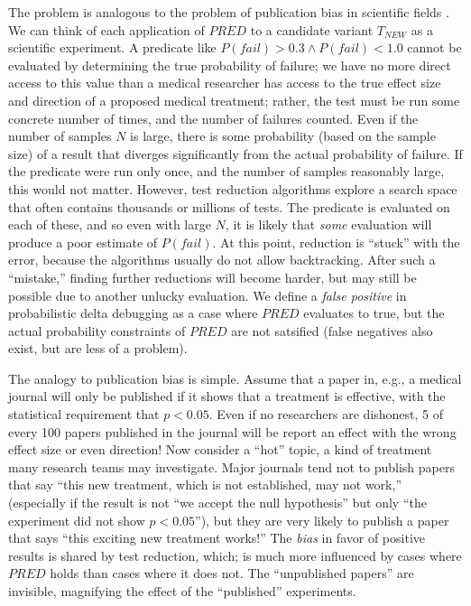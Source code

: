 The problem is analogous to the problem of publication bias in
scientific fields \cite{ahmed2012assessment}.  We can think of each
application of $\mathit{PRED}$ to a candidate variant
$T_{\mathit{NEW}}$ as a scientific experiment.  A predicate like
$P(\mathit{fail}) > 0.3 \wedge P(\mathit{fail}) < 1.0$ cannot be evaluated by
determining the true probability of failure; we have no more direct access to
this value than a medical researcher has access to the true effect
size and direction of a proposed medical treatment; rather, the test must be
run some concrete number of times, and the number of failures counted.
Even if the number of samples $N$ is large, there is some
probability (based on the sample size) of a result that diverges
significantly from the actual probability of failure.  If the
predicate were run only once, and the number of samples reasonably
large, this would not matter.  However, test reduction algorithms explore a search
space that often contains thousands or millions of
tests.  The predicate is evaluated on each of these, and so
even with large $N$, it is likely that \emph{some} evaluation will
produce a poor estimate of $P(\mathit{fail})$.  At this point, reduction is
``stuck'' with the error, because the
algorithms usually do not allow backtracking.  After such a ``mistake,'' finding further
reductions will become harder, but may still be possible due to
another unlucky evaluation.  We define a \emph{false positive} in probabilistic
delta debugging as a case where $\mathit{PRED}$ evaluates to true, but
the actual probability constraints of $\mathit{PRED}$ are not
satsified (false negatives
also exist, but are less of a problem).

The analogy to publication bias is simple.  Assume that a paper in,
e.g., a medical journal will only be published if it shows that a
treatment is effective, with the statistical requirement that $p <
0.05$.  Even if no researchers are dishonest, 5 of every 100 papers published
in the journal will be report an effect with the wrong effect size or
even direction!  Now consider a ``hot'' topic, a kind of
treatment many research teams may investigate.  Major journals tend
not to publish papers that say ``this new treatment, which is not
established, may not work,'' (especially if the result is not ``we
accept the null hypothesis'' but only ``the experiment did not
show $p < 0.05$''), but they  are very likely to publish a paper
that says ``this exciting new treatment works!'' 
The \emph{bias} in
favor of positive results is shared by test reduction, which;
is much more influenced by cases where
$\mathit{PRED}$ holds than cases where it does not.  The ``unpublished papers'' are invisible, magnifying the
effect of the ``published'' experiments.

